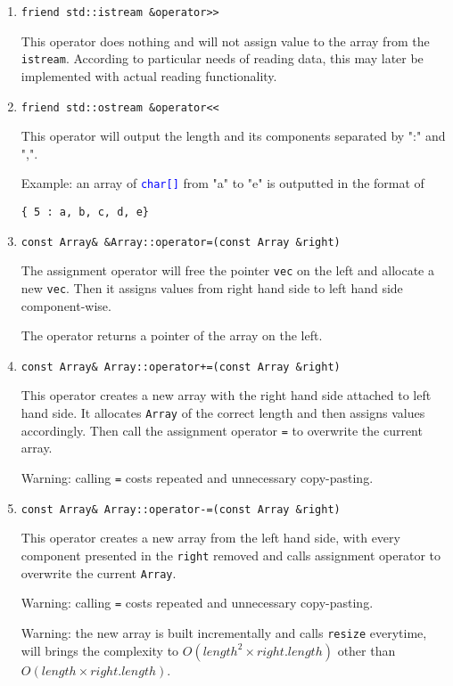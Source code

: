 \documentclass[11pt,a4paper]{article}
\newcommand{\ttype}[1]{\textcolor{blue}{\texttt{#1}}}
\theoremstyle{definition}
\theoremstyle{definition}
\numberwithin{equation}{section}
\begin{document}
	\begin{enumerate}
		\item \texttt{friend std::istream \&operator>>}
		
		This operator does nothing and will not assign value to the array from the \texttt{istream}. According to particular needs of reading data, this may later be implemented with actual reading functionality.
		
		\item \texttt{friend std::ostream \&operator<<}
		
		This operator will output the length and its components separated by ":" and ",".
		
		Example: an array of \ttype{char[]} from "a" to "e" is outputted in the format of
		
		\texttt{\{ 5 : a, b, c, d, e\}}
		
		\item \texttt{const Array\& &Array::operator=(const Array &right)}
		
		The assignment operator will free the pointer \texttt{vec} on the left and allocate a new \texttt{vec}. Then it assigns values from right hand side to left hand side component-wise. 
		
		The operator returns a pointer of the array on the left.
		
				
		\item \texttt{const Array\& Array::operator+=(const Array &right)}
		
		This operator creates a new array with the right hand side attached to left hand side. It allocates \texttt{Array} of the correct length and then assigns values accordingly. Then call the assignment operator \texttt{=} to overwrite the current array.
		
		Warning: calling \texttt{=} costs repeated and unnecessary copy-pasting.
		
		\item \texttt{const Array\& Array::operator-=(const Array &right)}
		
		This operator creates a new array from the left hand side, with every component presented in the \texttt{right} removed and calls assignment operator to overwrite the current \texttt{Array}.
		
		Warning: calling \texttt{=} costs repeated and unnecessary copy-pasting. 
		
		Warning: the new array is built incrementally and calls \texttt{resize} everytime, will brings the complexity to $O(length^2\times right.length)$ other than $O(length\times right.length)$.
		

\end{enumerate}
\end{document}
